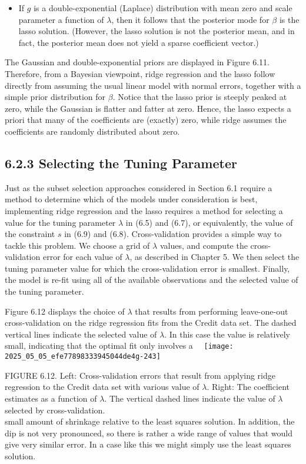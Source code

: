 \documentclass[10pt]{article}
\begin{document}
\begin{itemize}
  \item If $g$ is a double-exponential (Laplace) distribution with mean zero and scale parameter a function of $\lambda$, then it follows that the posterior mode for $\beta$ is the lasso solution. (However, the lasso solution is not the posterior mean, and in fact, the posterior mean does not yield a sparse coefficient vector.)
\end{itemize}

The Gaussian and double-exponential priors are displayed in Figure 6.11. Therefore, from a Bayesian viewpoint, ridge regression and the lasso follow directly from assuming the usual linear model with normal errors, together with a simple prior distribution for $\beta$. Notice that the lasso prior is steeply peaked at zero, while the Gaussian is flatter and fatter at zero. Hence, the lasso expects a priori that many of the coefficients are (exactly) zero, while ridge assumes the coefficients are randomly distributed about zero.

\subsection*{6.2.3 Selecting the Tuning Parameter}
Just as the subset selection approaches considered in Section 6.1 require a method to determine which of the models under consideration is best, implementing ridge regression and the lasso requires a method for selecting a value for the tuning parameter $\lambda$ in (6.5) and (6.7), or equivalently, the value of the constraint $s$ in (6.9) and (6.8). Cross-validation provides a simple way to tackle this problem. We choose a grid of $\lambda$ values, and compute the cross-validation error for each value of $\lambda$, as described in Chapter 5. We then select the tuning parameter value for which the cross-validation error is smallest. Finally, the model is re-fit using all of the available observations and the selected value of the tuning parameter.

Figure 6.12 displays the choice of $\lambda$ that results from performing leave-one-out cross-validation on the ridge regression fits from the Credit data set. The dashed vertical lines indicate the selected value of $\lambda$. In this case the value is relatively small, indicating that the optimal fit only involves a\
\
\texttt{[image: 2025\_05\_05\_efe77898333945044de4g-243]}

FIGURE 6.12. Left: Cross-validation errors that result from applying ridge regression to the Credit data set with various value of $\lambda$. Right: The coefficient estimates as a function of $\lambda$. The vertical dashed lines indicate the value of $\lambda$ selected by cross-validation.\\
small amount of shrinkage relative to the least squares solution. In addition, the dip is not very pronounced, so there is rather a wide range of values that would give very similar error. In a case like this we might simply use the least squares solution.
\end{document}
